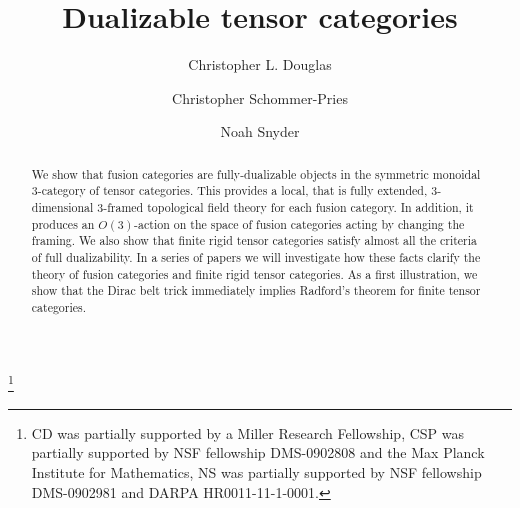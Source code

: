 \documentclass{amsart}
\begin{document}
\title{Dualizable tensor categories}

\begin{abstract}
We show that fusion categories are fully-dualizable objects in the symmetric monoidal 3-category of tensor categories.  This provides a local, that is fully extended, 3-dimensional 3-framed topological field theory for each fusion category. In addition, it produces an $O(3)$-action on the space of fusion categories acting by changing the framing. We also show that finite rigid tensor categories satisfy almost all the criteria of full dualizability.  In a series of papers we will investigate how these facts clarify the theory of fusion categories and finite rigid tensor categories.  As a first illustration, we show that the Dirac belt trick immediately implies Radford's theorem for finite tensor categories.
\end{abstract}

%
%
	
\author{Christopher L. Douglas}
\address{Mathematical Institute\\ University of Oxford\\ Oxford OX1 3LB\\ United Kingdom}
      	
\author{Christopher Schommer-Pries}
\address{Department of Mathematics\\ Max Planck Institute for Mathematics \\ 53111 Bonn \\ Germany}

\author{Noah Snyder}
\address{Department of Mathematics\\ Indiana University\\ Bloomington, IN 47401\\ USA}

\thanks{CD was partially supported by a Miller Research Fellowship, CSP was partially supported by NSF fellowship DMS-0902808 and the Max Planck Institute for Mathematics,  NS was partially supported by NSF fellowship DMS-0902981 and DARPA HR0011-11-1-0001.
}
\end{document}
